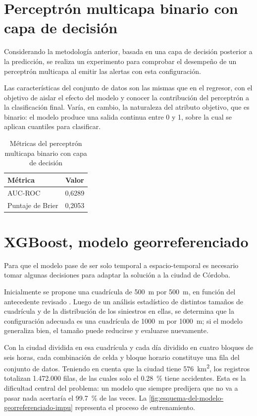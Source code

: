 \section{Perceptrón multicapa binario con capa de decisión}\label{perceptruxf3n-multicapa-binario-con-capa-de-decisiuxf3n.}

Considerando la metodología anterior, basada en una capa de decisión posterior a la predicción, se realiza un experimento para comprobar el desempeño de un perceptrón multicapa al emitir las alertas con esta configuración.

Las características del conjunto de datos son las mismas que en el \xgboost{} regresor, con el objetivo de aislar el efecto del modelo y conocer la contribución del perceptrón a la clasificación final. Varía, en cambio, la naturaleza del atributo objetivo, que es binario: el modelo produce una salida continua entre 0 y 1, sobre la cual se aplican cuantiles para clasificar.

\begin{table}[htbp]
\centering
\caption{Métricas del perceptrón multicapa binario con capa de decisión}
\label{tab:resumen-de-metricas-del-modelo}
\begin{tabular}{@{}lc@{}}
\toprule
\textbf{Métrica} & \textbf{Valor} \\
\midrule
AUC-ROC & 0,6289 \\
Puntaje de Brier & 0,2053 \\
\bottomrule
\end{tabular}
\end{table}

\section{XGBoost, modelo georreferenciado}\label{xgboost-modelo-georreferenciado}

Para que el modelo pase de ser solo temporal a espacio-temporal es necesario tomar algunas decisiones para adaptar la solución a la ciudad de Córdoba.

Inicialmente se propone una cuadrícula de 500~m por 500~m, en función del antecedente revisado \parencite{novello2022}. Luego de un análisis estadístico de distintos tamaños de cuadrícula y de la distribución de los siniestros en ellas, se determina que la configuración adecuada es una cuadrícula de 1000~m por 1000~m; si el modelo generaliza bien, el tamaño puede reducirse y evaluarse nuevamente.

Con la ciudad dividida en esa cuadrícula y cada día dividido en cuatro bloques de seis horas, cada combinación de celda y bloque horario constituye una fila del conjunto de datos. Teniendo en cuenta que la ciudad tiene 576~km\textsuperscript{2}, los registros totalizan 1.472.000 filas, de las cuales solo el \qty{0.28}{\percent} tiene accidentes. Esta es la dificultad central del problema: un modelo que siempre predijera que no va a pasar nada acertaría el \qty{99.7}{\percent} de las veces. La \cref{fig:esquema-del-modelo-georreferenciado-impu} representa el proceso de entrenamiento.

